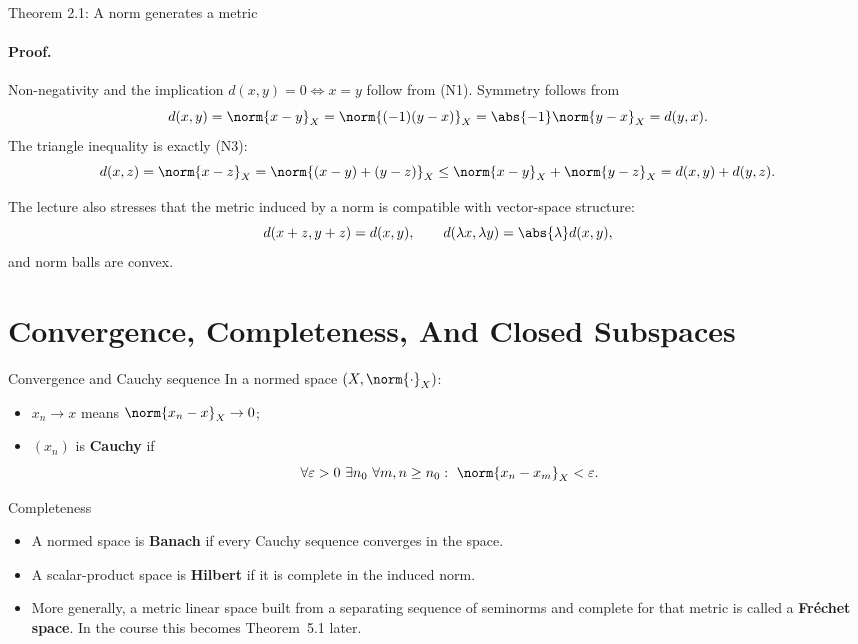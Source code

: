\documentclass[11pt]{article}
\begin{document}
\begin{thmbox}{Theorem 2.1: A norm generates a metric}
\thmNormInducesMetric
\end{thmbox}

\paragraph{Proof.}
Non-negativity and the implication $d(x,y)=0 \iff x=y$ follow from (N1). Symmetry follows from
\[
d(x,y)=\norm{x-y}_X=\norm{(-1)(y-x)}_X=\abs{-1}\norm{y-x}_X=d(y,x).
\]
The triangle inequality is exactly (N3):
\[
d(x,z)=\norm{x-z}_X=\norm{(x-y)+(y-z)}_X\le \norm{x-y}_X+\norm{y-z}_X=d(x,y)+d(y,z).
\]

\begin{focusbox}
The lecture also stresses that the metric induced by a norm is compatible with vector-space structure:
\[
d(x+z,y+z)=d(x,y),
\qquad
d(\lambda x,\lambda y)=\abs{\lambda}d(x,y),
\]
and norm balls are convex.
\end{focusbox}

\section{Convergence, Completeness, And Closed Subspaces}

\begin{defbox}{Convergence and Cauchy sequence}
In a normed space $(X,\norm{\cdot}_X)$:
\begin{itemize}
\item $x_n\to x$ means $\norm{x_n-x}_X\to 0$;
\item $(x_n)$ is \textbf{Cauchy} if
\[
\forall \varepsilon>0\ \exists n_0\ \forall m,n\ge n_0:\ \norm{x_n-x_m}_X<\varepsilon.
\]
\end{itemize}
\end{defbox}

\begin{defbox}{Completeness}
\begin{itemize}
\item A normed space is \textbf{Banach} if every Cauchy sequence converges in the space.
\item A scalar-product space is \textbf{Hilbert} if it is complete in the induced norm.
\item More generally, a metric linear space built from a separating sequence of seminorms and complete for that metric is called a \textbf{Fr\'echet space}. In the course this becomes Theorem~5.1 later.
\end{itemize}
\end{defbox}
\end{document}
